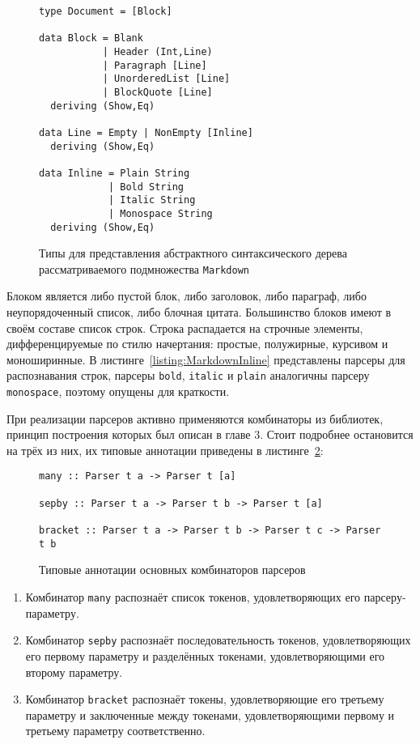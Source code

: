 \begin{figure}[t]
\begin{lstlisting}
type Document = [Block]

data Block = Blank
           | Header (Int,Line)
           | Paragraph [Line]
           | UnorderedList [Line]
           | BlockQuote [Line]
  deriving (Show,Eq)

data Line = Empty | NonEmpty [Inline]
  deriving (Show,Eq)

data Inline = Plain String
            | Bold String
            | Italic String
            | Monospace String
  deriving (Show,Eq)
\end{lstlisting}
\caption{Типы для представления абстрактного синтаксического дерева
рассматриваемого подмножества \lstinline{Markdown}}
\label{listing:MarkdownADT}
\end{figure}

Блоком является либо пустой блок, либо заголовок, либо параграф, либо
неупорядоченный список, либо блочная цитата. Большинство блоков имеют в своём
составе список строк. Строка распадается на строчные элементы, дифференцируемые
по стилю начертания: простые, полужирные, курсивом и моноширинные.
В листинге~\ref{listing:MarkdownInline} представлены парсеры для распознавания
строк, парсеры \lstinline{bold}, \lstinline{italic} и \lstinline{plain}
аналогичны парсеру \lstinline{monospace}, поэтому опущены для краткости.

При реализации парсеров активно применяются комбинаторы из библиотек, принцип
построения которых был описан в главе 3. Стоит подробнее остановится
на трёх из них, их типовые аннотации приведены в
листинге~\ref{listing:ParserCombinators}:

\begin{figure}[h]
\begin{lstlisting}
many :: Parser t a -> Parser t [a]

sepby :: Parser t a -> Parser t b -> Parser t [a]

bracket :: Parser t a -> Parser t b -> Parser t c -> Parser t b
\end{lstlisting}
\caption{Типовые аннотации основных комбинаторов парсеров}
\label{listing:ParserCombinators}
\end{figure}

\begin{enumerate}
  \item Комбинатор \lstinline{many} распознаёт список токенов, удовлетворяющих
  его парсеру-параметру.
  \item Комбинатор \lstinline{sepby} распознаёт последовательность токенов,
  удовлетворяющих его первому параметру и разделённых токенами, удовлетворяющими
  его второму параметру.
  \item Комбинатор \lstinline{bracket} распознаёт токены, удовлетворяющие его
  третьему параметру и заключенные между токенами, удовлетворяющими первому и
  третьему параметру соответственно.
\end{enumerate}

